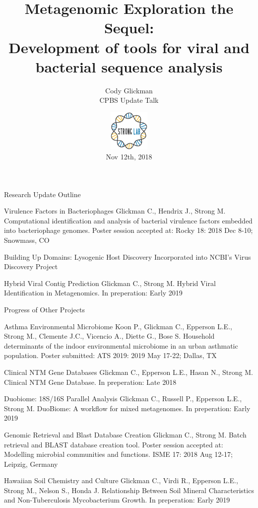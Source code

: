 \documentclass[11pt, xcolor=table]{beamer}
\author{Cody Glickman  \\ CPBS Update Talk}
\title{Metagenomic Exploration the Sequel: \\ Development of tools for viral and bacterial sequence analysis}
\date{ \includegraphics[height=2cm, width=2cm]{lablogo.png} \\ Nov 12th, 2018}
\begin{document}
	\maketitle

	\begin{frame}{Research Update Outline}
	\begin{block}{Virulence Factors in Bacteriophages}
	\tiny{Glickman C., Hendrix J., Strong M. Computational identification and analysis of bacterial virulence factors embedded into bacteriophage genomes. Poster session accepted at: Rocky 18: 2018 Dec 8-10; Snowmass, CO}
	\end{block}
	
	\begin{block}{Building Up Domains: Lysogenic Host Discovery}
  Incorporated into NCBI's Virus Discovery Project
	\end{block}

	\begin{block}{Hybrid Viral Contig Prediction}
	\tiny{Glickman C., Strong M. Hybrid Viral Identification in Metagenomics. In preperation: Early 2019}
	\end{block}
	\end{frame}
	\begin{frame}{Progress of Other Projects}
	\begin{block}{Asthma Environmental Microbiome}
	\tiny{Koon P., Glickman C., Epperson L.E., Strong M., Clemente J.C., Vicencio A., Diette G., Bose S. Household determinants of the indoor environmental microbiome in an urban asthmatic population. Poster submitted: ATS 2019: 2019 May 17-22; Dallas, TX}
 
	\end{block}
	
		
	\begin{block}{Clinical NTM Gene Databases}
	\tiny{Glickman C., Epperson L.E., Hasan N., Strong M. Clinical NTM Gene Database. In preperation: Late 2018}
	\end{block}
	
	\begin{block}{Duobiome: 18S/16S Parallel Analysis}
	\tiny{Glickman C., Russell P., Epperson L.E., Strong M. DuoBiome: A workflow for mixed metagenomes. In preperation: Early 2019}
	\end{block}
	
	
	\begin{block}{Genomic Retrieval and Blast Database Creation}
	\tiny{Glickman C., Strong M. Batch retrieval and BLAST database creation tool. Poster session accepted at: Modelling microbial communities and functions. ISME 17: 2018 Aug 12-17; Leipzig, Germany}
	\end{block}
	
	\begin{block}{Hawaiian Soil Chemistry and Culture}
	\tiny{Glickman C., Virdi R., Epperson L.E., Strong M., Nelson S., Honda J. Relationship Between Soil Mineral Characteristics and Non-Tuberculosis Mycobacterium Growth. In preperation: Early 2019}
	\end{block}
	

	\end{frame}
\end{document}
